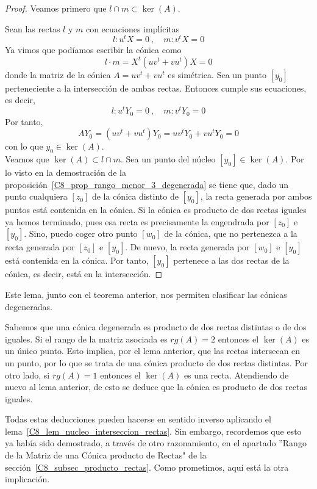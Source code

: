 \begin{proof}
	Veamos primero que $l\cap m\subset \ker(A)$. 
	
	Sean las rectas $l$ y $m$ con ecuaciones implícitas
	\begin{equation}
	l:u^tX=0\ , \quad m:v^tX=0
	\end{equation}
	Ya vimos que podíamos escribir la cónica como
	\begin{equation}
	l\cdot m=X^t(uv^t+vu^t)X=0
	\end{equation}
	donde la matriz de la cónica $A=uv^t+vu^t$ es simétrica. Sea un punto $[y_0]$ perteneciente a la intersección de ambas rectas. Entonces cumple sus ecuaciones, es decir,
	\begin{equation}
	l:u^tY_0=0\ , \quad m:v^tY_0=0
	\end{equation}
	Por tanto,
	\begin{equation}
	AY_0=(uv^t+vu^t)Y_0=uv^tY_0+vu^tY_0=0
	\end{equation}
	con lo que $y_0\in \ker(A)$.\\
	
	Veamos que $\ker(A)\subset l\cap m$. Sea un punto del núcleo $[y_0]\in \ker(A)$. Por lo visto en la demostración de la proposición~\ref{C8_prop_rango_menor_3_degenerada} se tiene que, dado un punto cualquiera $[z_0]$ de la cónica distinto de $[y_0]$, la recta generada por ambos puntos está contenida en la cónica. Si la cónica es producto de dos rectas iguales ya hemos terminado, pues esa recta es precisamente la engendrada por $[z_0]$ e $[y_0]$. Sino, puedo coger otro punto $[w_0]$ de la cónica, que no pertenezca a la recta generada por $[z_0]$ e $[y_0]$. De nuevo, la recta generada por $[w_0]$ e $[y_0]$ está contenida en la cónica. Por tanto, $[y_0]$ pertenece a las dos rectas de la cónica, es decir, está en la intersección.
\end{proof}
Este lema, junto con el teorema anterior, nos permiten clasificar las cónicas degeneradas. 

Sabemos que una cónica degenerada es producto de dos rectas distintas o de dos iguales. Si el rango de la matriz asociada es $rg(A)=2$ entonces el $\ker(A)$ es un único punto. Esto implica, por el lema anterior, que las rectas intersecan en un punto, por lo que se trata de una cónica producto de dos rectas distintas. Por otro lado, si $rg(A)=1$ entonces el $\ker(A)$ es una recta. Atendiendo de nuevo al lema anterior, de esto se deduce que la cónica es producto de dos rectas iguales.

Todas estas deducciones pueden hacerse en sentido inverso aplicando el lema~\ref{C8_lem_nucleo_interseccion_rectas}. Sin embargo, recordemos que esto ya había sido demostrado, a través de otro razonamiento, en el apartado ''Rango de la Matriz de una Cónica producto de Rectas" de la sección~\ref{C8_subsec_producto_rectas}. Como prometimos, aquí está la otra implicación.

